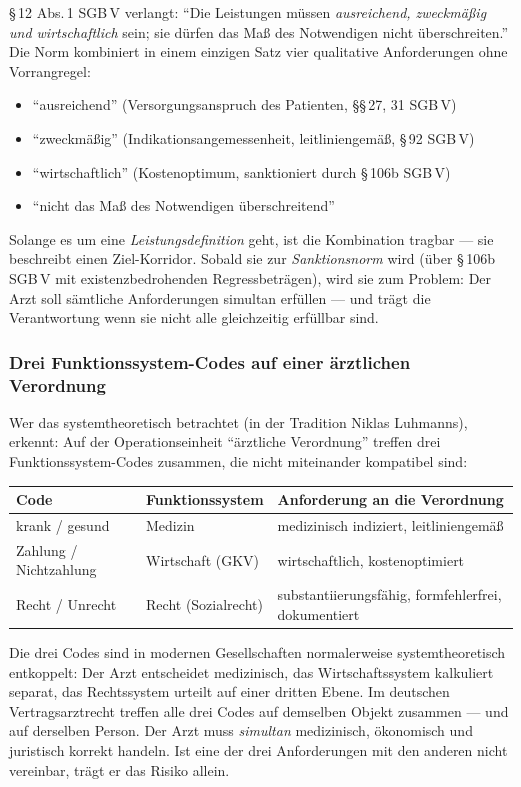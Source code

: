 \documentclass{umbruch-position}
\begin{document}
\S\,12 Abs.\,1 SGB\,V verlangt: ``Die Leistungen müssen \textit{ausreichend, zweckmäßig und wirtschaftlich} sein; sie dürfen das Maß des Notwendigen nicht überschreiten.'' Die Norm kombiniert in einem einzigen Satz vier qualitative Anforderungen ohne Vorrangregel:

\begin{itemize}[nosep]
  \item ``ausreichend'' (Versorgungsanspruch des Patienten, \S\S\,27, 31 SGB\,V)
  \item ``zweckmäßig'' (Indikationsangemessenheit, leitliniengemäß, \S\,92 SGB\,V)
  \item ``wirtschaftlich'' (Kostenoptimum, sanktioniert durch \S\,106b SGB\,V)
  \item ``nicht das Maß des Notwendigen überschreitend''
\end{itemize}

Solange es um eine \textit{Leistungsdefinition} geht, ist die Kombination tragbar — sie beschreibt einen Ziel-Korridor. Sobald sie zur \textit{Sanktionsnorm} wird (über \S\,106b SGB\,V mit existenzbedrohenden Regressbeträgen), wird sie zum Problem: Der Arzt soll sämtliche Anforderungen simultan erfüllen — und trägt die Verantwortung wenn sie nicht alle gleichzeitig erfüllbar sind.

\subsubsection{Drei Funktionssystem-Codes auf einer ärztlichen Verordnung}

Wer das systemtheoretisch betrachtet (in der Tradition Niklas Luhmanns), erkennt: Auf der Operationseinheit ``ärztliche Verordnung'' treffen drei Funktionssystem-Codes zusammen, die nicht miteinander kompatibel sind:

{\small
\begin{tabularx}{\textwidth}{X X X}
\toprule
\textbf{Code} & \textbf{Funktionssystem} & \textbf{Anforderung an die Verordnung} \\
\midrule
krank / gesund & Medizin & medizinisch indiziert, leitliniengemäß \\
Zahlung / Nichtzahlung & Wirtschaft (GKV) & wirtschaftlich, kostenoptimiert \\
Recht / Unrecht & Recht (Sozialrecht) & substantiierungsfähig, formfehlerfrei, dokumentiert \\
\bottomrule
\end{tabularx}
}

Die drei Codes sind in modernen Gesellschaften normalerweise systemtheoretisch entkoppelt: Der Arzt entscheidet medizinisch, das Wirtschaftssystem kalkuliert separat, das Rechtssystem urteilt auf einer dritten Ebene. Im deutschen Vertragsarztrecht treffen alle drei Codes auf demselben Objekt zusammen — und auf derselben Person. Der Arzt muss \textit{simultan} medizinisch, ökonomisch und juristisch korrekt handeln. Ist eine der drei Anforderungen mit den anderen nicht vereinbar, trägt er das Risiko allein.
\end{document}
